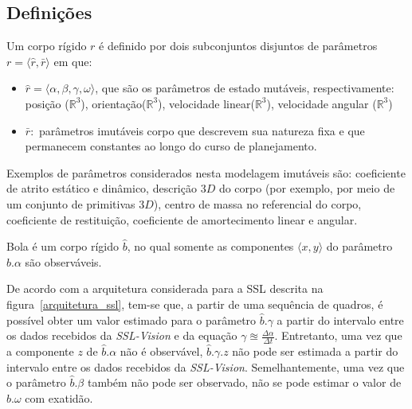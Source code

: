 \subsection{Definições}


\begin{defi}
  Um corpo rígido $r$ é definido por dois subconjuntos disjuntos
  de parâmetros $r= \langle \hat{r}, \bar{r} \rangle$ em que:
  \begin{itemize}
    \item $\hat{r} = \langle \alpha, \beta, \gamma, \omega \rangle$,
    que são os parâmetros de estado mutáveis, respectivamente:
    posição ($\mathbb{R} ^{3}$), orientação($\mathbb{R} ^{3}$),
    velocidade linear($\mathbb{R} ^{3}$), velocidade angular
    ($\mathbb{R} ^{3}$)

    \item $\bar{r} :$ parâmetros imutáveis corpo que descrevem sua
    natureza fixa e que permanecem constantes ao longo do curso de 
    planejamento.
  \end{itemize}
\end{defi}

  Exemplos de parâmetros considerados nesta modelagem imutáveis são:
  coeficiente de atrito estático e dinâmico, descrição $3D$ do corpo
  (por exemplo, por meio de um conjunto de primitivas $3D$), centro de
  massa no referencial do corpo, coeficiente de restituição,
  coeficiente de amortecimento linear e angular.

\begin{defi}[Bola]\label{def:bola}
  Bola é um corpo rígido $\hat{b}$, no qual somente as componentes
  $\langle x,y \rangle$ do parâmetro $\hat{b}.\alpha$ são
  observáveis.
\end{defi}

  De acordo com a  arquitetura considerada para a SSL descrita na
  figura~\ref{arquitetura_ssl}, tem-se que, a partir de uma sequência
  de quadros, é possível obter um valor estimado para o parâmetro
  $\hat{b}.\gamma$ a partir do intervalo entre os dados recebidos
  da \textit{SSL-Vision} e da equação $ \gamma \approxeq 
  \frac{\Delta \alpha}{\Delta t} $. Entretanto, uma vez que a componente
  $z$ de $\hat{b}.\alpha$ não é observável, $\hat{b}.\gamma.z$ 
  não pode ser estimada a partir do intervalo entre os dados recebidos
  da \textit{SSL-Vision}. Semelhantemente,  uma vez que o
  parâmetro $\hat{b}.\beta$ também não pode ser observado,
  não se pode estimar o valor de $\hat{b}.\omega$ com exatidão.

